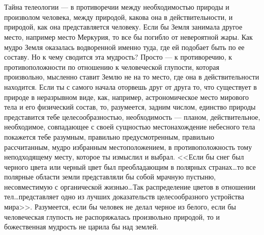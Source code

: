 \documentclass[12pt,oneside]{book}
\begin{document}
\chapter{}

Тайна телеологии --- в противоречии между необходимостью природы и произволом человека, между природой, какова она в действительности, и природой, как она представляется человеку. Если бы Земля занимала другое место, например место Меркурия, то все бы погибло от невероятной жары. Как мудро Земля оказалась водворенной именно туда, где ей подобает быть по ее составу. Но к чему сводится эта мудрость? Просто --- к противоречию, к противоположности по отношению к человеческой глупости, которая произвольно, мысленно ставит Землю не на то место, где она в действительности находится. Если ты с самого начала оторвешь друг от друга то, что существует в природе в неразрывном виде, как, например, астрономическое место мирового тела и его физический состав, то, разумеется, задним числом, единство природы представится тебе целесообразностью, необходимость --- планом, действительное, необходимое, совпадающее с своей сущностью местонахождение небесного тела покажется тебе разумным, правильно предусмотренным, правильно рассчитанным, мудро избранным местоположением, в противоположность тому неподходящему месту, которое ты измыслил и выбрал. <<Если бы снег был черного цвета или черный цвет был преобладающим в полярных странах\dots то все полярные области земли представляли бы собой мрачную пустыню, несовместимую с органической жизнью\dots Так распределение цветов в отношении тел\dots представляет одно из лучших доказательств целесообразного устройства мира>>. Разумеется, если бы человек не делал черное из белого, если бы человеческая глупость не распоряжалась произвольно природой, то и божественная мудрость не царила бы над землей.


\chapter{}
\end{document}
